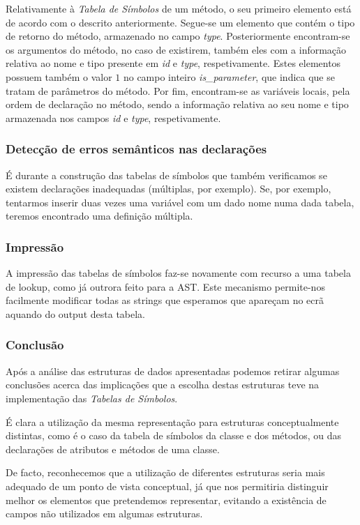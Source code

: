 \documentclass[11pt,a4paper]{article}
\begin{document}
	Relativamente à \emph{Tabela de Símbolos} de um método, o seu primeiro elemento está de acordo com o descrito anteriormente. Segue-se um elemento que contém o tipo de retorno do método, armazenado no campo \emph{type}. Posteriormente encontram-se os argumentos do método, no caso de existirem, também eles com a informação relativa ao nome e tipo presente em \emph{id} e \emph{type}, respetivamente. Estes elementos possuem também o valor $1$ no campo inteiro \emph{is\_parameter}, que indica que se tratam de parâmetros do método. Por fim, encontram-se as variáveis locais, pela ordem de declaração no método, sendo a informação relativa ao seu nome e tipo armazenada nos campos \emph{id} e \emph{type}, respetivamente.

	\subsubsection{Detecção de erros semânticos nas declarações}
	É durante a construção das tabelas de símbolos que também verificamos se existem declarações inadequadas (múltiplas, por exemplo). Se, por exemplo, tentarmos inserir duas vezes uma variável com um dado nome numa dada tabela, teremos encontrado uma definição múltipla.

	\subsubsection{Impressão}
	A impressão das tabelas de símbolos faz-se novamente com recurso a uma tabela de lookup, como já outrora feito para a AST. Este mecanismo permite-nos facilmente modificar todas as strings que esperamos que apareçam no ecrã aquando do output desta tabela.
	
	\subsubsection{Conclusão}
	
	Após a análise das estruturas de dados apresentadas podemos retirar algumas conclusões acerca das implicações que a escolha destas estruturas teve na implementação das \emph{Tabelas de Símbolos}.
	
	É clara a utilização da mesma representação para estruturas conceptualmente distintas, como é o caso da tabela de símbolos da classe e dos métodos, ou das declarações de atributos e métodos de uma classe.
	
	De facto, reconhecemos que a utilização de diferentes estruturas seria mais adequado de um ponto de vista conceptual, já que nos permitiria distinguir melhor os elementos que pretendemos representar, evitando a existência de campos não utilizados em algumas estruturas.
	
\end{document}
